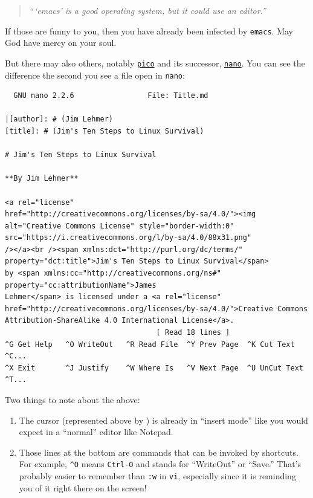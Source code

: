 \documentclass[10pt,]{book}
\numberwithin{figure}{chapter}
\begin{document}
\begin{quote}
\emph{``\,`emacs' is a good operating system, but it could use an
editor.''}
\end{quote}

If those are funny to you, then you have already been infected by
\texttt{emacs}. May God have mercy on your soul.

But there may also others, notably
\href{http://linux.die.net/man/1/pico}{\texttt{pico}} and its successor,
\href{http://linux.die.net/man/1/nano}{\texttt{nano}}. You can see the
difference the second you see a file open in \texttt{nano}:

\begin{verbatim}
  GNU nano 2.2.6                 File: Title.md                                        

|[author]: # (Jim Lehmer)
[title]: # (Jim's Ten Steps to Linux Survival)

# Jim's Ten Steps to Linux Survival

**By Jim Lehmer**

<a rel="license"
href="http://creativecommons.org/licenses/by-sa/4.0/"><img
alt="Creative Commons License" style="border-width:0"
src="https://i.creativecommons.org/l/by-sa/4.0/88x31.png"
/></a><br /><span xmlns:dct="http://purl.org/dc/terms/"
property="dct:title">Jim's Ten Steps to Linux Survival</span>
by <span xmlns:cc="http://creativecommons.org/ns#"
property="cc:attributionName">James
Lehmer</span> is licensed under a <a rel="license"
href="http://creativecommons.org/licenses/by-sa/4.0/">Creative Commons
Attribution-ShareAlike 4.0 International License</a>.
                                   [ Read 18 lines ]
^G Get Help   ^O WriteOut   ^R Read File  ^Y Prev Page  ^K Cut Text   ^C...
^X Exit       ^J Justify    ^W Where Is   ^V Next Page  ^U UnCut Text ^T...
\end{verbatim}

Two things to note about the above:

\begin{enumerate}
\def\labelenumi{\arabic{enumi}.}
\item
  The cursor (represented above by \texttt{\textbar{}}) is already in
  ``insert mode'' like you would expect in a ``normal'' editor like
  Notepad.
\item
  Those lines at the bottom are commands that can be invoked by
  shortcuts. For example, \texttt{\^{}O} means \texttt{Ctrl-O} and
  stands for ``WriteOut'' or ``Save.'' That's probably easier to
  remember than \texttt{:w} in \texttt{vi}, especially since it is
  reminding you of it right there on the screen!
\end{enumerate}
\end{document}
